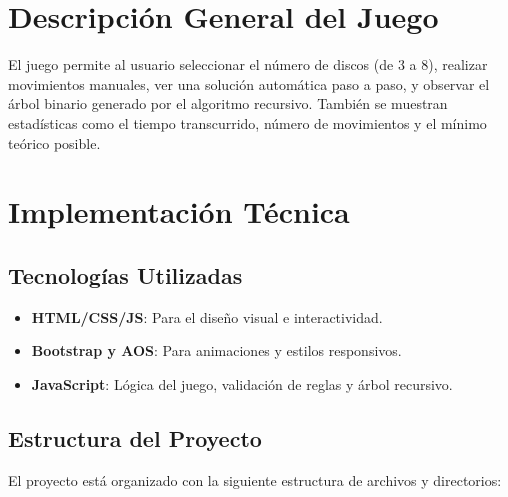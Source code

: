 \documentclass{article}
\begin{document}
\section{Descripción General del Juego}
El juego permite al usuario seleccionar el número de discos (de 3 a 8), realizar movimientos manuales, ver una solución automática paso a paso, y observar el árbol binario generado por el algoritmo recursivo. También se muestran estadísticas como el tiempo transcurrido, número de movimientos y el mínimo teórico posible.

\section{Implementación Técnica}

\subsection{Tecnologías Utilizadas}
\begin{itemize}
    \item \textbf{HTML/CSS/JS}: Para el diseño visual e interactividad.
    \item \textbf{Bootstrap y AOS}: Para animaciones y estilos responsivos.
    \item \textbf{JavaScript}: Lógica del juego, validación de reglas y árbol recursivo.
\end{itemize}

\subsection{Estructura del Proyecto}
El proyecto está organizado con la siguiente estructura de archivos y directorios:
\end{document}

